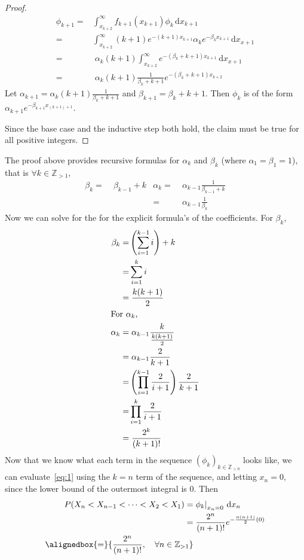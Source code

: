 \documentclass{mthe353answer}
\begin{document}
\begin{questions}
\begin{proof}
    \begin{align*}
      \phi_{k+1} =& \int_{x_{k+2}}^{\infty} f_{k+1}(x_{k+1}) \phi_k \, \mathrm{d}x_{k+1}\\
      =& \int_{x_{k+2}}^{\infty} (k+1)e^{-(k+1)x_{k+1}} \alpha_k e^{-\beta_k x_{k+1}} \, \mathrm{d}x_{x+1}\\
      =&\; \alpha_k (k+1) \int_{x_{k+2}}^{\infty} e^{-(\beta_k+k+1)x_{k+1}} \, \mathrm{d}x_{x+1}\\
      =&\; \alpha_k (k+1) \frac{1}{\beta_k+k+1} e^{-(\beta_k+k+1)x_{k+2}}
    \end{align*}
    Let \(\alpha_{k+1}=\alpha_k (k+1) \frac{1}{\beta_k+k+1}\) and 
    \(\beta_{k+1}=\beta_k+k+1\). Then \(\phi_k\) is of the form 
    \(\alpha_{k+1}e^{-\beta_{k+1}x_{(k+1)+1}}\).

    Since the base case and the inductive step both hold, the claim must be true
    for all positive integers.
  \end{proof}
  The proof above provides recursive formulas for \(\alpha_k\) and \(\beta_k\)
  (where \(\alpha_1 = \beta_1 = 1\)), that is \(\forall k \in \mathbb{Z}_{>1}\),
  \begin{align*}
    \beta_k =&\; \beta_{k-1} + k & \alpha_k =&\; \alpha_{k-1} \frac{1}{\beta_{k-1} + k}\\
             &                    &          =&\; \alpha_{k-1} \frac{1}{\beta_k}
  \end{align*}
  Now we can solve for the for the explicit formula's of the coefficients. For \(\beta_k\),
  \begin{align*}
    \beta_k =& \left(\sum_{i=1}^{k-1}i\right)+k\\
    =& \sum_{i=1}^{k}i\\
    =&\; \frac{k(k+1)}{2}\\
    \intertext{For \(\alpha_k\),}
    \alpha_k =&\; \alpha_{k-1}\frac{k}{\frac{k(k+1)}{2}}\\
    =&\; \alpha_{k-1} \frac{2}{k+1}\\
    =&\left(\prod_{i=1}^{k-1}\frac{2}{i+1}\right)\frac{2}{k+1}\\
    =& \prod_{i=1}^{k} \frac{2}{i+1}\\
    =&\; \frac{2^k}{(k+1)!}
  \end{align*}
  Now that we know what each term in the sequence \((\phi_k)_{k \in \mathbb{Z}_{>0}}\)
  looks like, we can evaluate~\eqref{eq:1} using the \(k = n\)
  term of the sequence, and letting \(x_n = 0\), since the lower bound of the
  outermost integral is 0. Then
  \begin{align*}
    P(X_n<X_{n-1}<\cdots<X_2<X_1) =& \left.\phi_{k}\right|_{x_n=0} \, \mathrm{d}x_n\\
    =&\; \frac{2^{n}}{(n+1)!} e^{-\frac{n(n+1)}{2}(0)}\\
    \alignedbox{=}{\frac{2^{n}}{(n+1)!},\quad \forall n \in \mathbb{Z}_{>1}}
  \end{align*}
\end{questions}
\end{document}
